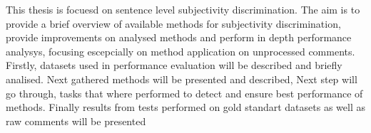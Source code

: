 This thesis is focuesd on sentence level subjectivity discrimination. The aim is to provide a brief overview of available methods for subjectivity discrimination, 
provide improvements on analysed methods and perform in depth performance analysys, focusing escepcially on method application on unprocessed comments. 
Firstly, datasets used in performance evaluation will be described and briefly analised. Next gathered methods will be presented and described, 
Next step will go through, tasks that where performed to detect and ensure best performance of methods. Finally results from tests performed on gold 
standart datasets as well as raw comments will be presented